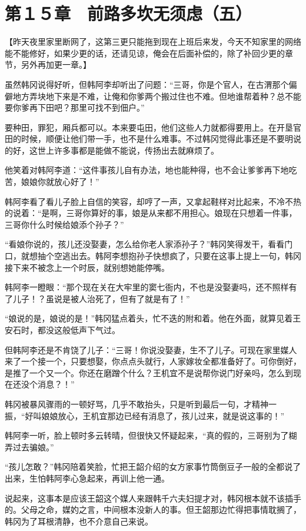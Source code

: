 \section{第１５章　前路多坎无须虑（五）}

【昨天夜里家里断网了，这第三更只能拖到现在上班后来发，今天不知家里的网络能不能修好，如果少更的话，还请见谅，俺会在后面补偿的，除了补回少更的章节，另外再加更一章。】

虽然韩冈说得好听，但韩阿李却听出了问题：“三哥，你是个官人，在古渭那个偏僻地方弄块地下来是不难，让俺和你爹两个搬过住也不难。但地谁帮着种？总不能要你爹再下田吧？那里可找不到佃户。”

要种田，罪犯，厢兵都可以。本来要屯田，他们这些人力就都得要用上。在开垦官田的时候，顺便让他们带一手，也不是什么难事。不过韩冈觉得此事还是不要明说的好，这世上许多事都是能做不能说，传扬出去就麻烦了。

他笑着对韩阿李道：“这件事孩儿自有办法，地也能种得，也不会让爹爹再下地吃苦，娘娘你就放心好了！”

韩阿李看了看儿子脸上自信的笑容，却哼了一声，又拿起鞋样对比起来，不冷不热的说着：“是啊，三哥你算好的事，娘是从来都不用担心。娘现在只想着一件事，三哥你什么时候给娘添个孙子？”

“看娘你说的，孩儿还没娶妻，怎么给你老人家添孙子？”韩冈笑得发干，看看门口，就想抽个空逃出去。韩阿李想抱孙子快想疯了，只要在这事上提上一句，韩冈接下来不被念上一个时辰，就别想她能停嘴。

韩阿李一瞪眼：“那个现在关在大牢里的窦七衙内，不也是没娶妻吗，还不照样有了儿子！？虽说是被人治死了，但有了就是有了！”

“娘说的是，娘说的是！”韩冈猛点着头，忙不迭的附和着。他在外面，就算见着王安石时，都没这般低声下气过。

但韩阿李还是不肯饶了儿子：“三哥！你说没娶妻，生不了儿子。可现在家里媒人来了一个接一个，只要想娶，你点点头就行，人家嫁妆全都准备好了。可你倒好，是推了一个又一个。你还在磨蹭个什么？王机宜不是说帮你说门好亲吗，怎么到现在还没个消息？！”

韩冈被暴风骤雨的一顿好骂，几乎不敢抬头，只是听到最后一句，才精神一振，“好叫娘娘放心，王机宜那边已经有消息了，孩儿过来，就是说这事的！”

韩阿李一听，脸上顿时多云转晴，但很快又怀疑起来，“真的假的，三哥别为了糊弄过去骗娘。”

“孩儿怎敢？”韩冈陪着笑脸，忙把王韶介绍的女方家事竹筒倒豆子一般的全都说了出来，生怕韩阿李心急起来，再训上他一通。

说起来，这事本是应该王韶这个媒人来跟韩千六夫妇提才对，韩冈根本就不该插手的。父母之命，媒妁之言，中间根本没新人的事。但王韶那边忙得把事情耽搁了，韩冈为了耳根清静，也不介意自己来说。

